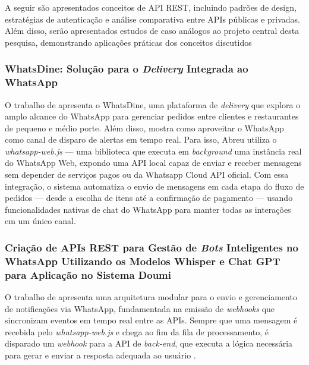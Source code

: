 
A seguir são apresentados conceitos de API REST, incluindo padrões de design, estratégias de autenticação e análise comparativa entre APIs públicas e privadas. Além disso, serão apresentados estudos de caso análogos ao projeto central desta pesquisa, demonstrando aplicações práticas dos conceitos discutidos

\subsubsection{WhatsDine: Solução para o \textit{Delivery} Integrada ao WhatsApp}

O trabalho de \cite{abreu2023} apresenta o WhatsDine, uma plataforma de \textit{delivery} que explora o amplo alcance do WhatsApp para gerenciar pedidos entre clientes e restaurantes de pequeno e médio porte. Além disso, mostra como aproveitar o WhatsApp como canal de disparo de alertas em tempo real. Para isso, Abreu utiliza o \textit{whatsapp-web.js} — uma biblioteca que executa em \textit{background} uma instância real do WhatsApp Web, expondo uma API local capaz de enviar e receber mensagens sem depender de serviços pagos ou da Whatsapp Cloud API oficial. Com essa integração, o sistema automatiza o envio de mensagens em cada etapa do fluxo de pedidos — desde a escolha de itens até a confirmação de pagamento — usando funcionalidades nativas de chat do WhatsApp para manter todas as interações em um único canal.

\subsubsection{Criação de APIs REST para Gestão de \textit{Bots} Inteligentes no WhatsApp Utilizando os Modelos Whisper e Chat GPT para Aplicação no Sistema Doumi}

O trabalho de \cite{dias2024} apresenta uma arquitetura modular para o envio e gerenciamento de notificações via WhatsApp, fundamentada na emissão de \textit{webhooks} que sincronizam eventos em tempo real entre as APIs. Sempre que uma mensagem é recebida pelo \textit{whatsapp-web.js} e chega ao fim da fila de processamento, é disparado um \textit{webhook} para a API de \textit{back‑end}, que executa a lógica necessária para gerar e enviar a resposta adequada ao usuário . 

